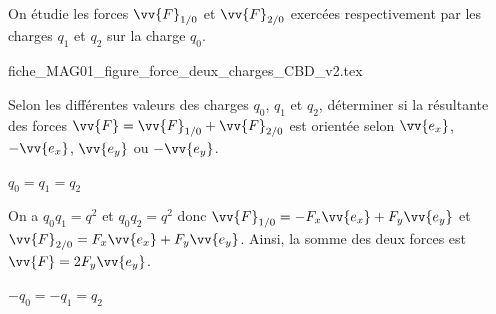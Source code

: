 On étudie les forces $\vv{F}_{1/0}$ et $\vv{F}_{2/0}$ exercées respectivement par les charges $q_1$ et $q_2$ sur la charge $q_0$.%

\initialisationPartieDroite %
\begin{center}
	{fiche_MAG01_figure_force_deux_charges_CBD_v2.tex}
\end{center}
                               \finalisationDuPartageDePage %

Selon les différentes valeurs des charges $q_0$, $q_1$ et $q_2$, déterminer si la résultante des forces $\vv{F} = \vv{F}_{1/0} + \vv{F}_{2/0}$ est orientée selon $\vv{e_x}$, $-\vv{e_x}$, $\vv{e_y}$ ou $-\vv{e_y}$.

\debutEntrainement


\begin{enonce}
	$q_0 = q_1 = q_2$
\end{enonce}


\begin{corrige}
	On a $q_0q_1 = q^2$ et $q_0q_2 = q^2$ donc $\vv{F}_{1/0} = -F_x \vv{e_x} + F_y \vv{e_y}$ et $\vv{F}_{2/0} = F_x \vv{e_x} + F_y \vv{e_y}$. Ainsi, la somme des deux forces est $\vv{F} = 2F_y \vv{e_y}$.
\end{corrige}




\begin{enonce}
	$-q_0 = -q_1 = q_2$
\end{enonce}

